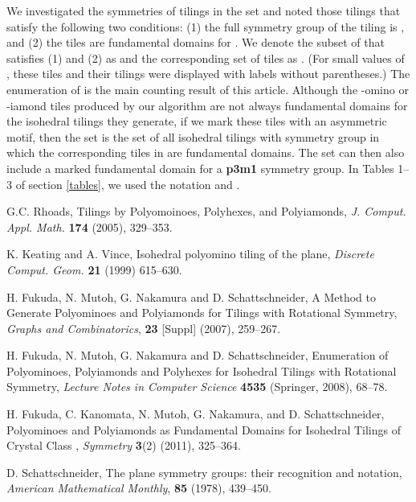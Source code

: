 \documentclass{ws-ijcga}
\begin{document}
We investigated the symmetries of tilings in the set  and noted those tilings that
satisfy the following two conditions: 
(1) the full symmetry group of the tiling is , and 
(2) the tiles are fundamental domains for . 
We denote the subset of  that satisfies (1) and (2)
as  and the corresponding set of tiles as . 
(For small values of , these tiles and their tilings were displayed with labels without parentheses.) 
The enumeration of  is the main counting result of this article. 
Although the -omino or -iamond tiles produced by our algorithm are not 
always fundamental domains for the isohedral tilings they generate, if we mark
these tiles with an asymmetric motif, then the set  is the set of all isohedral tilings with
symmetry group  in which the corresponding tiles in  are fundamental domains. 
The set  can then also include a marked fundamental domain for a {\bf p3m1} symmetry group. 
In Tables 1--3 of section \ref{tables}, we used the notation  and 
.







\begin{thebibliography}{0}
G.C. Rhoads, 
Tilings by Polyomoinoes, Polyhexes, and Polyiamonds,
{\it J. Comput. Appl. Math.} {\bf 174} (2005), 329--353.

K. Keating and A. Vince,
Isohedral polyomino tiling of the plane,
{\it Discrete Comput. Geom.} {\bf 21} (1999) 615--630.

H. Fukuda, N. Mutoh, G. Nakamura and D. Schattschneider,
A Method to Generate Polyominoes and
Polyiamonds for Tilings with Rotational Symmetry,
{\it Graphs and Combinatorics}, 
{\bf 23} [Suppl] (2007), 259--267.

H. Fukuda, N. Mutoh, G. Nakamura and D. Schattschneider,
Enumeration of Polyominoes, Polyiamonds and Polyhexes for 
Isohedral Tilings with Rotational Symmetry,
{\it Lecture Notes in Computer Science} {\bf 4535} (Springer, 2008), 68--78.

H. Fukuda, C. Kanomata, N. Mutoh, G. Nakamura, and D. Schattschneider, 
Polyominoes and Polyiamonds as Fundamental Domains for Isohedral Tilings of Crystal Class , 
{\it Symmetry} {\bf 3}(2) (2011), 325--364.


D. Schattschneider,
The plane symmetry groups:
their recognition and notation,
{\it American Mathematical Monthly}, {\bf 85} (1978), 439--450.

\end{thebibliography}
\end{document}
